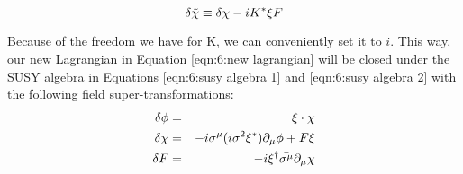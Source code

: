 \begin{equation}
    \delta \Tilde{\chi} \equiv \delta \chi - i K^* \xi F
    \label{eqn:6:new spinor field}
\end{equation}

Because of the freedom we have for K, we can conveniently set it to $i$. This way, our new Lagrangian in Equation \ref{eqn:6:new lagrangian} will be closed under the SUSY algebra in Equations \ref{eqn:6:susy algebra 1} and \ref{eqn:6:susy algebra 2} with the following field super-transformations:
\begin{eqnarray}
    \delta \phi &=& \xi \cdot\chi \nonumber \\
    \delta \chi &=& - i \sigma^\mu (i \sigma^2 \xi^*) \partial_\mu \phi + F\xi \nonumber \\
    \delta F &=& -i \xi^\dagger \Bar{\sigma^\mu} \partial_\mu \chi \nonumber
\end{eqnarray}

